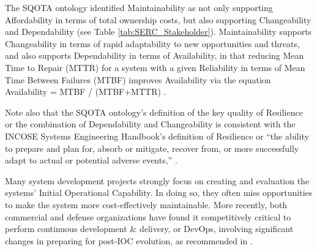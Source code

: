 The SQOTA ontology identified Maintainability as not only supporting Affordability in terms of total ownership costs, but also supporting Changeability and Dependability (see Table \ref{tab:SERC_Stakeholder}). Maintainability supports Changeability in terms of rapid adaptability to new opportunities and threats, and also supports Dependability in terms of Availability, in that reducing Mean Time to Repair (MTTR) for a system with a given Reliability in terms of Mean Time Between Failures (MTBF) improves Availability via the equation Availability = MTBF / (MTBF+MTTR) \cite{IIS2:IIS2278}.

Note also that the SQOTA ontology’s definition of the key quality of Resilience or the combination of Dependability and Changeability is consistent with the INCOSE Systems Engineering Handbook’s definition of Resilience or “the ability to prepare and plan for, absorb or mitigate, recover from, or more successfully adapt to actual or potential adverse events,”
\cite{incose2015systems,haimes2012systems}.

Many system development projects strongly focus on creating and evaluation the systems’ Initial Operational Capability. In doing so, they often miss opportunities to make the system more cost-effectively maintainable. 
More recently, both commercial and defense organizations have found it competitively critical to perform continuous development \& delivery, or DevOps, involving significant changes in preparing for post-IOC evolution, as recommended in \cite{DefenseScienceBoard}.

